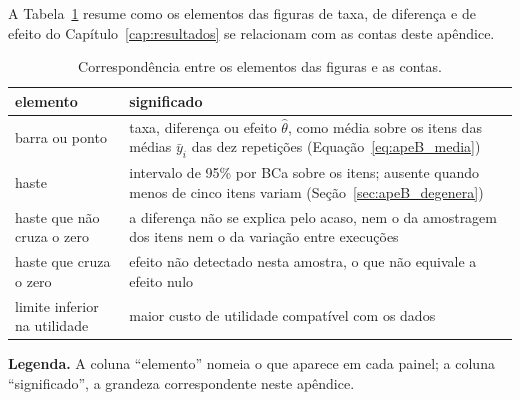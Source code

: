 A Tabela~\ref{tab:apeB_leitura} resume como os elementos das figuras de taxa,
de diferença e de efeito do Capítulo~\ref{cap:resultados} se relacionam com
as contas deste apêndice.

\begin{table}[H]
\centering
\caption{Correspondência entre os elementos das figuras e as contas.}
\label{tab:apeB_leitura}
\begin{tabular}{p{}p{}}
\toprule
elemento & significado \\
\midrule
barra ou ponto & taxa, diferença ou efeito $\hat\theta$, como média sobre os itens das médias $\bar y_i$ das dez repetições (Equação~\ref{eq:apeB_media}) \\
haste & intervalo de 95\% por BCa sobre os itens; ausente quando menos de cinco itens variam (Seção~\ref{sec:apeB_degenera}) \\
haste que não cruza o zero & a diferença não se explica pelo acaso, nem o da amostragem dos itens nem o da variação entre execuções \\
haste que cruza o zero & efeito não detectado nesta amostra, o que não equivale a efeito nulo \\
limite inferior na utilidade & maior custo de utilidade compatível com os dados \\
\bottomrule
\end{tabular}
\vspace{2pt}
\begin{minipage}{\textwidth}
\footnotesize\raggedright
\textbf{Legenda.} A coluna ``elemento'' nomeia o que aparece em cada painel;
a coluna ``significado'', a grandeza correspondente neste apêndice.
\end{minipage}
\end{table}
